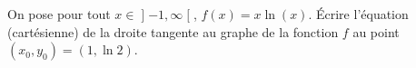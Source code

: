 

\begin{exercice}\label{exoOutilsMath-0100}

    On pose pour tout \( x\in\mathopen] -1 , \infty \mathclose[\), \( f(x)=x\ln(x)\). Écrire l'équation (cartésienne) de la droite tangente au graphe de la fonction \( f\) au point \( (x_0,y_0)=(1,\ln 2)\).

\end{exercice}
